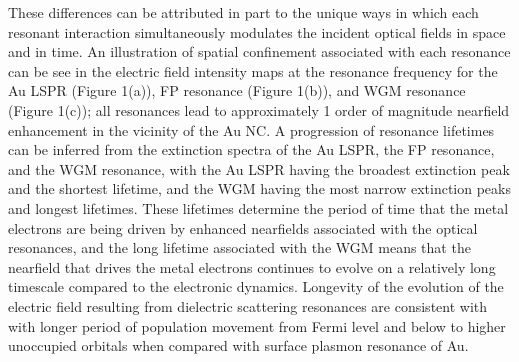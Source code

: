 \documentclass[journal=jpclcd,manuscript=article]{achemso}
\begin{document}
These differences can be attributed in part to the unique ways in which each resonant interaction simultaneously modulates the incident optical
fields in space and in time. An illustration of spatial confinement associated with each resonance can be see in the
electric field intensity maps at the resonance frequency for the
Au LSPR (Figure 1(a)), FP resonance (Figure 1(b)), and WGM resonance (Figure 1(c)); all resonances lead to approximately 1 order of
magnitude nearfield enhancement in the vicinity of the Au NC.
A progression of resonance lifetimes can be inferred from the extinction spectra of the Au LSPR, the FP resonance, and the WGM resonance, with
the Au LSPR having the broadest extinction peak and the shortest lifetime, and the WGM having the most narrow extinction peaks and longest lifetimes.  These
lifetimes determine the period of time that the metal electrons are being driven by enhanced nearfields associated with the optical resonances, and
the long lifetime associated with the WGM means that the nearfield that drives the metal electrons continues to evolve on a relatively long timescale compared
to the electronic dynamics.
Longevity of the evolution of the electric field resulting from dielectric scattering resonances are consistent with
with longer period of population movement from Fermi level and below to higher unoccupied orbitals when compared with surface plasmon
resonance of Au.
\end{document}
